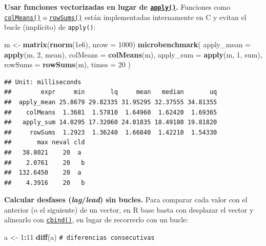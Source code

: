 \documentclass[
]{book}
\newenvironment{Shaded}{\begin{snugshade}}{\end{snugshade}}
\newcommand{\AttributeTok}[1]{\textcolor[rgb]{0.13,0.29,0.53}{#1}}
\newcommand{\CommentTok}[1]{\textcolor[rgb]{0.56,0.35,0.01}{\textit{#1}}}
\newcommand{\DecValTok}[1]{\textcolor[rgb]{0.00,0.00,0.81}{#1}}
\newcommand{\FloatTok}[1]{\textcolor[rgb]{0.00,0.00,0.81}{#1}}
\newcommand{\FunctionTok}[1]{\textcolor[rgb]{0.13,0.29,0.53}{\textbf{#1}}}
\newcommand{\NormalTok}[1]{#1}
\newcommand{\OtherTok}[1]{\textcolor[rgb]{0.56,0.35,0.01}{#1}}
\newcommand{\SpecialCharTok}[1]{\textcolor[rgb]{0.81,0.36,0.00}{\textbf{#1}}}
\theoremstyle{break}
\theoremstyle{nonumberplain}
\renewcommand{\CommentTok}[1]{\textcolor[rgb]{0.41,0.41,0.41}{\texttt{#1}}}
\begin{document}
\textbf{Usar funciones vectorizadas en lugar de \href{https://rdrr.io/r/base/apply.html}{\texttt{apply()}}.} Funciones como \href{https://rdrr.io/r/base/colSums.html}{\texttt{colMeans()}} o \href{https://rdrr.io/r/base/colSums.html}{\texttt{rowSums()}} están implementadas internamente en C y evitan el bucle (implícito) de \texttt{apply()}:

\begin{Shaded}
\begin{Highlighting}[]
\NormalTok{m }\OtherTok{\textless{}{-}} \FunctionTok{matrix}\NormalTok{(}\FunctionTok{rnorm}\NormalTok{(}\FloatTok{1e6}\NormalTok{), }\AttributeTok{nrow =} \DecValTok{1000}\NormalTok{)}
\FunctionTok{microbenchmark}\NormalTok{(}
  \AttributeTok{apply\_mean =} \FunctionTok{apply}\NormalTok{(m, }\DecValTok{2}\NormalTok{, mean),}
  \AttributeTok{colMeans   =} \FunctionTok{colMeans}\NormalTok{(m),}
  \AttributeTok{apply\_sum  =} \FunctionTok{apply}\NormalTok{(m, }\DecValTok{1}\NormalTok{, sum),}
  \AttributeTok{rowSums    =} \FunctionTok{rowSums}\NormalTok{(m),}
  \AttributeTok{times =} \DecValTok{20}
\NormalTok{)}
\end{Highlighting}
\end{Shaded}

\begin{verbatim}
## Unit: milliseconds
##        expr     min       lq     mean   median       uq
##  apply_mean 25.8679 29.82335 31.95295 32.37555 34.81355
##    colMeans  1.3681  1.57810  1.64960  1.62420  1.69365
##   apply_sum 14.0295 17.32060 24.01835 18.49180 19.81820
##     rowSums  1.2923  1.36240  1.66840  1.42210  1.54330
##       max neval cld
##   38.8021    20  a 
##    2.0761    20   b
##  132.6450    20  a 
##    4.3916    20   b
\end{verbatim}

\textbf{Calcular desfases (\emph{lag}/\emph{lead}) sin bucles.} Para comparar cada valor con el anterior (o el siguiente) de un vector, en R base basta con desplazar el vector y alinearlo con \href{https://rdrr.io/r/base/cbind.html}{\texttt{cbind()}}, en lugar de recorrerlo con un bucle:

\begin{Shaded}
\begin{Highlighting}[]
\NormalTok{a }\OtherTok{\textless{}{-}} \DecValTok{1}\SpecialCharTok{:}\DecValTok{11}
\FunctionTok{diff}\NormalTok{(a)                 }\CommentTok{\# diferencias consecutivas}
\end{Highlighting}
\end{Shaded}
\end{document}
